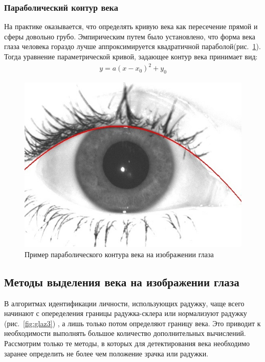 \documentclass[12pt]{article} %
\begin{document}
\subsubsection{Параболический контур века}

На практике оказывается, что определять кривую века как пересечение прямой и сферы довольно грубо. Эмпирическим путем было установлено, что форма века глаза человека гораздо лучше аппроксимируется квадратичной параболой(рис.~\ref{fig:glaz5}). Тогда уравнение параметрической кривой, задающее контур века принимает вид:
\begin{gather}\label{par1}
	y = a(x-x_0)^2 + y_0
\end{gather}

\begin{figure}[h]
	
	\centering
	
	\includegraphics[width=0.6\linewidth]{glaz5.jpg}
	
	\caption{Пример параболического контура века на изображении глаза}
	
	\label{fig:glaz5}
	
\end{figure}

\newpage
\subsection{Методы выделения века на изображении глаза}

В алгоритмах идентификации личности, использующих радужку, чаще всего начинают с опеределения границы радужка-склера \cite{Adam_1, Daugman, Matv} или нормализуют радужку (рис.~\ref{fig:glaz3}) \cite{Min}, а лишь только потом определяют границу века. Это приводит к необходимости выполнять большое количество дополнительных вычислений. Рассмотрим только те методы, в которых для детектирования века необходимо заранее определить не более чем положение зрачка или радужки.
\end{document}
